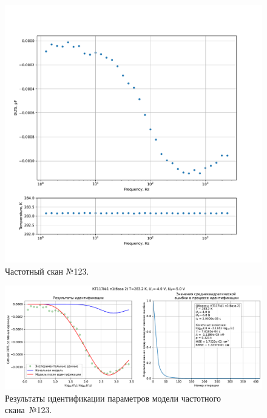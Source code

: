 \begin{figure}[!ht]
    \centering
    \includegraphics[width=1\textwidth]{../plots/КТ117№1_п1(база 2)_2500Гц-1Гц_1пФ_+10С_-4В-5В_50мВ_20мкс_шаг_0,1.pdf}
    \caption{Частотный скан №123.}
    \label{pic:frequency_scan_123}
\end{figure}

\begin{figure}[!ht]
    \centering
    \includegraphics[width=1\textwidth]{../plots/КТ117№1_п1(база 2)_2500Гц-1Гц_1пФ_+10С_-4В-5В_50мВ_20мкс_шаг_0,1_model.pdf}
    \caption{Результаты идентификации параметров модели частотного скана~№123.}
    \label{pic:frequency_scan_model123}
\end{figure}

\pagebreak


